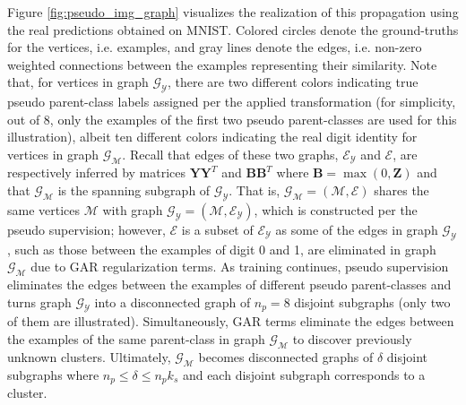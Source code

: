 \documentclass{article} \usepackage{iclr2018_conference,times}
\begin{document}
Figure \ref{fig:pseudo_img_graph} visualizes the realization of this propagation using the real predictions obtained on MNIST. Colored circles denote the ground-truths for the vertices, i.e. examples, and gray lines denote the edges, i.e. non-zero weighted connections between the examples representing their similarity. Note that, for vertices in graph $\mathcal{G}_\mathcal{Y}$, there are two different colors indicating true pseudo parent-class labels assigned per the applied transformation (for simplicity, out of 8, only the examples of the first two pseudo parent-classes are used for this illustration), albeit ten different colors indicating the real digit identity for vertices in graph $\mathcal{G}_\mathcal{M}$. Recall that edges of these two graphs, $\mathcal{E}_\mathcal{Y}$ and $\mathcal{E}$, are respectively inferred by matrices $\boldsymbol{Y}\boldsymbol{Y}^T$ and $\boldsymbol{B}\boldsymbol{B}^T$ where $\boldsymbol{B}=\max(0,\boldsymbol{Z})$ and that $\mathcal{G}_\mathcal{M}$ is the spanning subgraph of $\mathcal{G}_\mathcal{Y}$. That is, $\mathcal{G}_\mathcal{M}=(\mathcal{M},\mathcal{E})$ shares the same vertices $\mathcal{M}$ with graph $\mathcal{G}_\mathcal{Y}=(\mathcal{M},\mathcal{E}_\mathcal{Y})$, which is constructed per the pseudo supervision; however, $\mathcal{E}$ is a subset of $\mathcal{E}_\mathcal{Y}$ as some of the edges in graph $\mathcal{G}_\mathcal{Y}$, such as those between the examples of digit 0 and 1, are eliminated in graph $\mathcal{G}_\mathcal{M}$ due to GAR regularization terms. As training continues, pseudo supervision eliminates the edges between the examples of different pseudo parent-classes and turns graph $\mathcal{G}_\mathcal{Y}$ into a disconnected graph of $n_p=8$ disjoint subgraphs (only two of them are illustrated). Simultaneously, GAR terms eliminate the edges between the examples of the same parent-class in graph $\mathcal{G}_\mathcal{M}$ to discover previously unknown clusters. Ultimately, $\mathcal{G}_\mathcal{M}$ becomes disconnected graphs of $\delta$ disjoint subgraphs where $n_p\le \delta \le n_pk_s$ and each disjoint subgraph corresponds to a cluster. 
\end{document}
